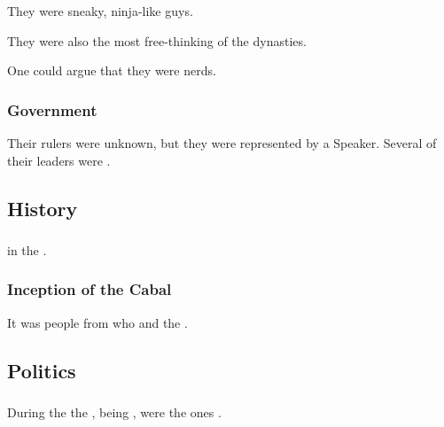 They were sneaky, ninja-like guys. 

They were also the most free-thinking of the dynasties. 

One could argue that they were nerds. 





\subsubsection{Government}
Their rulers were unknown, but they were represented by a Speaker. 
Several of their leaders were \resviel. 









\subsection{History}





\subsubsection{\ResphanWars}
\TiphredSerah {} in the \resphanwars. 





\subsubsection{Inception of the Cabal}
It was people from \TiphredSerah{} who  and  the . 









\subsection{Politics}





\subsubsection{\Kezerad}
During the  the \TiphredSerah{}, being , were the ones . 

























